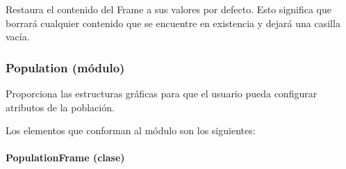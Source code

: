\documentclass[letterpaper,10pt,english]{sphinxmanual}
\begin{document}
\begin{fulllineitems}
\begin{fulllineitems}
\begin{quote}
\begin{description}
\end{description}\end{quote}

\end{fulllineitems}


\begin{fulllineitems}
\label{View/Main/ObjectiveFunction/FunctionFrame:View.Main.ObjectiveFunction.FunctionFrame.FunctionFrame.restore_settings}
Restaura el contenido del Frame a sus valores por defecto.
Esto significa que borrará cualquier contenido que se encuentre en existencia y 
dejará una casilla vacía.

\end{fulllineitems}


\end{fulllineitems}



\subsubsection{Population (módulo)}
\label{View/Main/Population/Population::doc}\label{View/Main/Population/Population:population-modulo}
Proporciona las estructuras gráficas para que el usuario pueda
configurar atributos de la población.

Los elementos que conforman al módulo son los siguientes:


\paragraph{PopulationFrame (clase)}
\label{View/Main/Population/PopulationFrame:populationframe-clase}\label{View/Main/Population/PopulationFrame:module-View.Main.Population.PopulationFrame}\label{View/Main/Population/PopulationFrame::doc}
\end{document}
